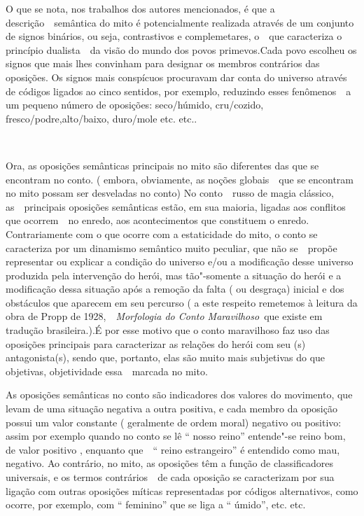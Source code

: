 O que se nota, nos trabalhos dos autores mencionados, é que a
descrição~~semântica do mito é potencialmente realizada através de um
conjunto de signos binários, ou seja, contrastivos e complemetares,
o~~que caracteriza o princípio dualista~~da visão do mundo dos povos
primevos.Cada povo escolheu os signos que mais lhes convinham para
designar os membros contrários das oposições. Os signos mais conspícuos
procuravam dar conta do universo através de códigos ligados ao cinco
sentidos, por exemplo, reduzindo esses fenômenos~~a um pequeno número de
oposições: seco/húmido, cru/cozido, fresco/podre,alto/baixo, duro/mole
etc. etc..

~

Ora, as oposições semânticas principais no mito são diferentes das que
se encontram no conto. ( embora, obviamente, as noções globais~~que se
encontram no mito possam ser desveladas no conto) No conto~~russo de
magia clássico, as~~principais oposições semânticas estão, em sua
maioria, ligadas aos conflitos que ocorrem~~no enredo, aos
acontecimentos que constituem o enredo. Contrariamente com o que ocorre
com a estaticidade do mito, o conto se caracteriza por um dinamismo
semântico muito peculiar, que não se~~propõe representar ou explicar a
condição do universo e/ou a modificação desse universo produzida pela
intervenção do herói, mas tão"-somente a situação do herói e a
modificação dessa situação após a remoção da falta ( ou desgraça)
inicial e dos obstáculos que aparecem em seu percurso ( a este respeito
remetemos à leitura da obra de Propp de 1928,~~\emph{Morfologia do Conto
Maravilhoso}~que existe em tradução brasileira.).É por esse motivo que o
conto maravilhoso faz uso das oposições principais para caracterizar as
relações do herói com seu (s) antagonista(s), sendo que, portanto, elas
são muito mais subjetivas do que objetivas, objetividade essa~~marcada
no mito.

As oposições semânticas no conto são indicadores dos valores do
movimento, que levam de uma situação negativa a outra positiva, e cada
membro da oposição possui um valor constante ( geralmente de ordem
moral) negativo ou positivo: assim por exemplo quando no conto se lê ``
nosso reino'' entende"-se reino bom, de valor positivo , enquanto que~~``
reino estrangeiro'' é entendido como mau, negativo. Ao contrário, no
mito, as oposições têm a função de classificadores universais, e os
termos contrários~~de cada oposição se caracterizam por sua ligação com
outras oposições míticas representadas por códigos alternativos, como
ocorre, por exemplo, com `` feminino'' que se liga a `` úmido'', etc.
etc.

